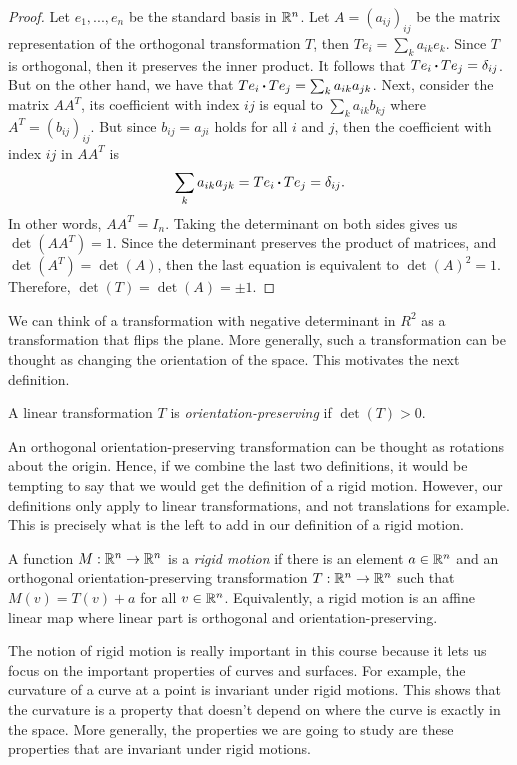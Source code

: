 \begin{proof}
    Let $e_1, ..., e_n$ be the standard basis in $\mathbb{R}^n$. Let $A = (a_{ij})_{ij}$ be the matrix representation of the orthogonal transformation $T$, then $Te_i = \sum_k a_{ik}e_k$. Since $T$ is orthogonal, then it preserves the inner product. It follows that $Te_i \operatorname{\boldsymbol{\cdot}} Te_j = \delta_{ij}$. But on the other hand, we have that $Te_i \operatorname{\boldsymbol{\cdot}} Te_j = \sum_k a_{ik}a_{jk}$. Next, consider the matrix $AA^T$, its coefficient with index $ij$ is equal to $\sum_k a_{ik}b_{kj}$ where $A^T = (b_{ij})_{ij}$. But since $b_{ij} = a_{ji}$ holds for all $i$ and $j$, then the coefficient with index $ij$ in $AA^T$ is
    $$\sum_k a_{ik}a_{jk} = Te_i \operatorname{\boldsymbol{\cdot}} Te_j = \delta_{ij}.$$
    In other words, $AA^T = I_n$. Taking the determinant on both sides gives us $\det(AA^T) = 1$. Since the determinant preserves the product of matrices, and $\det(A^T) = \det(A)$, then the last equation is equivalent to $\det(A)^2 = 1$. Therefore, $\det(T)= \det(A) = \pm 1$.
\end{proof}

We can think of a transformation with negative determinant in $R^2$ as a transformation that flips the plane. More generally, such a transformation can be thought as changing the orientation of the space. This motivates the next definition.

\begin{definition}
    A linear transformation $T$ is \textit{orientation-preserving} if $\det (T) > 0$.
\end{definition}

An orthogonal orientation-preserving transformation can be thought as rotations about the origin. Hence, if we combine the last two definitions, it would be tempting to say that we would get the definition of a rigid motion. However, our definitions only apply to linear transformations, and not translations for example. This is precisely what is the left to add in our definition of a rigid motion.

\begin{definition}
    A function $M : \mathbb{R}^n \to \mathbb{R}^n$ is a \textit{rigid motion} if there is an element $a \in \mathbb{R}^n$ and an orthogonal orientation-preserving transformation $T : \mathbb{R}^n \to \mathbb{R}^n$ such that $M(v) = T(v) + a$ for all $v \in \mathbb{R}^n$. Equivalently, a rigid motion is an affine linear map where linear part is orthogonal and orientation-preserving.
\end{definition}

The notion of rigid motion is really important in this course because it lets us focus on the important properties of curves and surfaces. For example, the curvature of a curve at a point is invariant under rigid motions. This shows that the curvature is a property that doesn't depend on where the curve is exactly in the space. More generally, the properties we are going to study are these properties that are invariant under rigid motions. 

